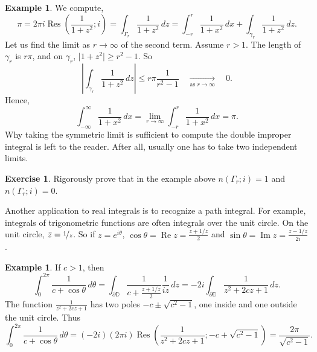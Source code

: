 \documentclass[12pt,openany]{book}
\renewcommand{\Re}{\operatorname{Re}}
\renewcommand{\Im}{\operatorname{Im}}
\newcommand{\sabs}[1]{\lvert {#1} \rvert}
\newcommand{\abs}[1]{\left\lvert {#1} \right\rvert}
\newcommand{\D}{{\mathbb{D}}}
\theoremstyle{plain}
\theoremstyle{remark}
\theoremstyle{definition}
\newenvironment{exbox}{%
    \def\FrameCommand{\vrule width 1pt \relax\hspace{10pt}}%
    \MakeFramed{\advance\hsize-\width\FrameRestore}%
}{%
    \endMakeFramed
}
\theoremstyle{exercise}
\newtheorem{exercise}{Exercise}[section]
\theoremstyle{example}
\newtheorem{example}[thm]{Example}
\begin{document}
\begin{example}
We compute,
\begin{equation*}
\pi 
=
2 \pi i \operatorname{Res}\left(\frac{1}{1+z^2};i\right) =
\int_{\Gamma_r} \frac{1}{1+z^2} \, dz
=
\int_{-r}^r \frac{1}{1+x^2} \, dx
+
\int_{\gamma_r} \frac{1}{1+z^2} \, dz .
\end{equation*}
Let us find the limit as $r \to \infty$ of the second term.
Assume $r > 1$.
The length of $\gamma_r$ is $r\pi$,
and on $\gamma_r$,
$\sabs{1+z^2} \geq r^2-1$.  So
\begin{equation*}
\abs{
\int_{\gamma_r} \frac{1}{1+z^2} \, dz 
}
\leq
r \pi \frac{1}{r^2-1}
\quad\underset{\text{as } r \to \infty}{\to}\quad 0 .
\end{equation*}
Hence,
\begin{equation*}
\int_{-\infty}^\infty
\frac{1}{1+x^2} \, dx
=
\lim_{r\to \infty} \int_{-r}^r 
\frac{1}{1+x^2} \, dx
= \pi .
\end{equation*}
Why taking the symmetric limit is sufficient to compute the double improper
integral is left to the reader.  After all, usually one has to
take two independent limits.
\end{example}

\begin{exbox}
\begin{exercise}
Rigorously prove that in the example above
$n(\Gamma_r;i) = 1$ and
$n(\Gamma_r;i) = 0$.
\end{exercise}
\end{exbox}

Another application to real integrals is to recognize 
a path integral.  For example, integrals of trigonometric functions
are often integrals over the unit circle.  On the unit
circle, $\bar{z} = \nicefrac{1}{z}$.  So if $z=e^{i\theta}$,
$\cos \theta = \Re z = \frac{z+1/z}{2}$ and
$\sin \theta = \Im z = \frac{z-1/z}{2i}$.

\begin{example}
If $c > 1$, then
\begin{equation*}
\int_0^{2\pi} \frac{1}{c+\cos \theta} \, d\theta 
=
\int_{\partial \D} \frac{1}{c+\frac{z+1/z}{2}} \frac{1}{iz} \, dz
=
-2i
\int_{\partial \D} \frac{1}{z^2 + 2cz + 1} \, dz
.
\end{equation*}
The function $\frac{1}{z^2 + 2cz + 1}$ has two poles $-c \pm \sqrt{c^2-1}$,
one inside and one outside the unit circle.  Thus
\begin{equation*}
\int_0^{2\pi} \frac{1}{c+\cos \theta} \, d\theta 
=
(-2i)
(2 \pi i)
\operatorname{Res}
\left(\frac{1}{z^2 + 2cz + 1}; -c+\sqrt{c^2-1}\right)
=
\frac{2\pi}{\sqrt{c^2-1}}
.
\end{equation*}
\end{example}
\end{document}
